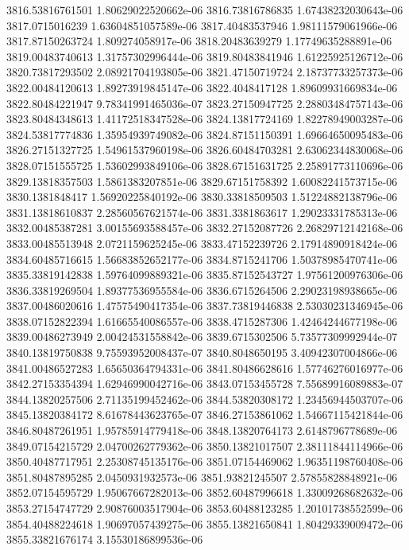 {3816.53816761501 1.80629022520662e-06
3816.73816786835 1.67438232030643e-06
3817.0715016239 1.63604851057589e-06
3817.40483537946 1.98111579061966e-06
3817.87150263724 1.809274058917e-06
3818.20483639279 1.17749635288891e-06
3819.00483740613 1.31757302996444e-06
3819.80483841946 1.61225925126712e-06
3820.73817293502 2.08921704193805e-06
3821.47150719724 2.18737733257373e-06
3822.00484120613 1.89273919845147e-06
3822.4048417128 1.89609931669834e-06
3822.80484221947 9.78341991465036e-07
3823.27150947725 2.28803484757143e-06
3823.80484348613 1.41172518347528e-06
3824.13817724169 1.82278949003287e-06
3824.53817774836 1.35954939749082e-06
3824.87151150391 1.69664650095483e-06
3826.27151327725 1.54961537960198e-06
3826.60484703281 2.63062344830068e-06
3828.07151555725 1.53602993849106e-06
3828.67151631725 2.25891773110696e-06
3829.13818357503 1.5861383207851e-06
3829.67151758392 1.60082241573715e-06
3830.1381848417 1.56920225840192e-06
3830.33818509503 1.51224882138796e-06
3831.13818610837 2.28560567621574e-06
3831.3381863617 1.29023331785313e-06
3832.00485387281 3.00155693588457e-06
3832.27152087726 2.26829712142168e-06
3833.00485513948 2.0721159625245e-06
3833.47152239726 2.17914890918424e-06
3834.60485716615 1.56683852652177e-06
3834.8715241706 1.50378985470741e-06
3835.33819142838 1.59764099889321e-06
3835.87152543727 1.97561200976306e-06
3836.33819269504 1.89377536955584e-06
3836.6715264506 2.29023198938665e-06
3837.00486020616 1.47575490417354e-06
3837.73819446838 2.53030231346945e-06
3838.07152822394 1.61665540086557e-06
3838.4715287306 1.42464244677198e-06
3839.00486273949 2.00424531558842e-06
3839.6715302506 5.73577309992944e-07
3840.13819750838 9.75593952008437e-07
3840.8048650195 3.40942307004866e-06
3841.00486527283 1.65650364794331e-06
3841.80486628616 1.57746276016977e-06
3842.27153354394 1.62946990042716e-06
3843.07153455728 7.55689916089883e-07
3844.13820257506 2.71135199452462e-06
3844.53820308172 1.23456944503707e-06
3845.13820384172 8.61678443623765e-07
3846.27153861062 1.54667115421844e-06
3846.80487261951 1.95785914779418e-06
3848.13820764173 2.6148796778689e-06
3849.07154215729 2.04700262779362e-06
3850.13821017507 2.38111844114966e-06
3850.40487717951 2.25308745135176e-06
3851.07154469062 1.96351198760408e-06
3851.80487895285 2.0450931932573e-06
3851.93821245507 2.57855828848921e-06
3852.07154595729 1.95067667282013e-06
3852.60487996618 1.33009268682632e-06
3853.27154747729 2.90876003517904e-06
3853.60488123285 1.20101738552599e-06
3854.40488224618 1.90697057439275e-06
3855.13821650841 1.80429339009472e-06
3855.33821676174 3.15530186899536e-06
}

